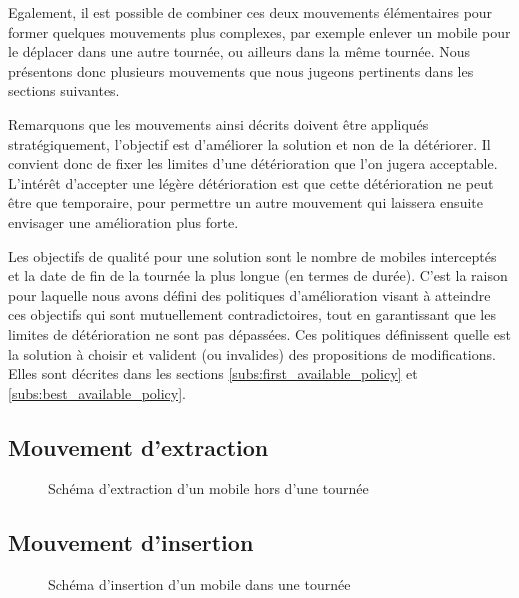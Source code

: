 		Egalement, il est possible de combiner ces deux mouvements élémentaires pour former quelques mouvements plus complexes, par exemple enlever un mobile pour le déplacer dans une autre tournée, ou ailleurs dans la même tournée. Nous présentons donc plusieurs mouvements que nous jugeons pertinents dans les sections suivantes.

		Remarquons que les mouvements ainsi décrits doivent être appliqués stratégiquement, l'objectif est d'améliorer la solution et non de la détériorer. Il convient donc de fixer les limites d'une détérioration que l'on jugera acceptable. L'intérêt d'accepter une légère détérioration est que cette détérioration ne peut être que temporaire, pour permettre un autre mouvement qui laissera ensuite envisager une amélioration plus forte.

		Les objectifs de qualité pour une solution sont le nombre de mobiles interceptés et la date de fin de la tournée la plus longue (en termes de durée). C'est la raison pour laquelle nous avons défini des politiques d'amélioration visant à atteindre ces objectifs qui sont mutuellement contradictoires, tout en garantissant que les limites de détérioration ne sont pas dépassées. Ces politiques définissent quelle est la solution à choisir et valident (ou invalides) des propositions de modifications. Elles sont décrites dans les sections \ref{subs:first_available_policy} et \ref{subs:best_available_policy}.

		\subsection{Mouvement d'extraction}
			\label{subs:move_extract}
			\begin{figure}[h!]
			\centering
			\begin{tikzpicture}[schema]
				
			\end{tikzpicture}
			\caption{Schéma d'extraction d'un mobile hors d'une tournée}
			\label{fig:move_extract}
			\end{figure}

		\subsection{Mouvement d'insertion}
			\label{subs:move_insert}
			\begin{figure}[h!]
			\centering
			\begin{tikzpicture}[schema]
				
			\end{tikzpicture}
			\caption{Schéma d'insertion d'un mobile dans une tournée}
			\label{fig:move_insert}
			\end{figure}


